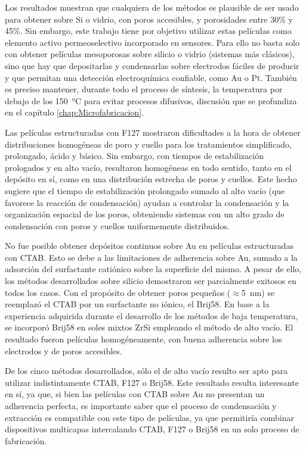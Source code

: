 	Los resultados muestran que cualquiera de los métodos es plausible de ser usado para obtener \pdm\space sobre Si o vidrio, con poros accesibles, y porosidades entre 30\% y 45\%. Sin embargo, este trabajo tiene por objetivo utilizar estas películas como elemento activo permeoselectivo incorporado en sensores. Para ello no basta solo con obtener películas mesoporosas sobre silicio o vidrio (sistemas más clásicos), sino que hay que depositarlas y condensarlas sobre electrodos fáciles de producir y que permitan una detección electroquímica confiable, como Au o Pt. También es preciso mantener, durante todo el proceso de síntesis, la temperatura por debajo de los \SI{150}{\celsius} para evitar procesos difusivos, discusión que se profundiza en el capítulo \ref{chap:Microfabricacion}.

	Las películas estructuradas con F127 mostraron dificultades a la hora de obtener distribuciones homogéneas de poro y cuello para los tratamientos simplificado, prolongado, ácido y básico. Sin embargo, con tiempos de estabilización prologados y en alto vacío, resultaron homogéneas en todo sentido, tanto en el depósito en sí, como en una distribución estrecha de poros y cuellos. Este hecho sugiere que el tiempo de estabilización prolongado sumado al alto vacío (que favorece la reacción de condensación) ayudan a controlar la condensación y la organización espacial de los poros, obteniendo sistemas con un alto grado de condensación con poros y cuellos uniformemente distribuidos.

	No fue posible obtener depósitos continuos sobre Au en películas estructuradas con CTAB. Esto se debe a las limitaciones de adherencia sobre Au, sumado a la adsorción del surfactante catiónico sobre la superficie del mismo. A pesar de ello, los métodos desarrollados sobre silicio demostraron ser parcialmente exitosos en todos los casos. Con el propósito de obtener poros pequeños ($\approx$\SI{5}{\nm}) se reemplazó el CTAB por un surfactante no iónico, el Brij58. En base a la experiencia adquirida durante el desarrollo de los métodos de baja temperatura, se incorporó Brij58 en soles mixtos Zr\textbar Si empleando el método de alto vacío. El resultado fueron películas homogéneamente, con buena adherencia sobre los electrodos y de poros accesibles.

	De los cinco métodos desarrollados, sólo el de alto vacío resulto ser apto para utilizar indistintamente CTAB, F127 o Brij58. Este resultado resulta interesante en sí, ya que, si bien las películas con CTAB sobre Au no presentan un adherencia perfecta, es importante saber que el proceso de condensación y extracción es compatible con este tipo de películas, ya que permitiría combinar dispositivos multicapas intercalando CTAB, F127 o Brij58 en un solo proceso de fabricación.

